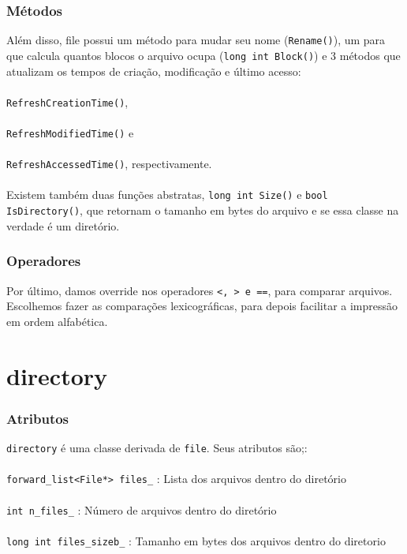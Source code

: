\documentclass{beamer}
\begin{document}
\begin{frame}
	 \frametitle{Métodos}
	Além disso, file possui um método para mudar seu nome (\texttt{Rename()}), um para que calcula quantos blocos o arquivo ocupa (\texttt{long int Block()}) e 3 métodos que atualizam os tempos de criação, modificação e último acesso:\\~\\
	\texttt{RefreshCreationTime()},\\~\\
	\texttt{RefreshModifiedTime()} e \\~\\
	\texttt{RefreshAccessedTime()}, respectivamente. \\~\\
	
	Existem também duas funções abstratas, \texttt{long int Size()} e \texttt{bool IsDirectory()}, que retornam o tamanho em bytes do arquivo e se essa classe na verdade é um diretório.
\end{frame}

\begin{frame}
	\frametitle{Operadores}
	Por último, damos override nos operadores \texttt{<, > e ==}, para comparar arquivos. Escolhemos fazer as comparações lexicográficas, para depois facilitar a impressão em ordem alfabética. 
\end{frame}

\section{directory}

\begin{frame}
  \frametitle{Atributos}
  \texttt{directory} é uma classe derivada de \texttt{file}. Seus atributos são;:\\~\\
  
  \texttt{forward_list<File*> files\_}   : Lista dos arquivos dentro do diretório\\~\\
  \texttt{int n\_files\_}                : Número de arquivos dentro do diretório\\~\\
  \texttt{long int files\_sizeb\_}       : Tamanho em bytes dos arquivos dentro do diretorio\\~\\
      

\end{frame}
\end{document}
